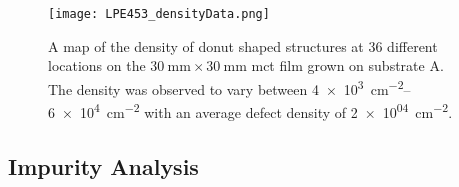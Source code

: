 \begin{figure}[htbp]
    \centering
    \texttt{[image: LPE453\_densityData.png]}
    \caption[Map of the density of donut shaped structures on the \ac{mct} film grown on substrate A.]{A map of the density of donut shaped structures at 36 different locations on the $\SI{30}{\milli\metre}\times\SI{30}{\milli\metre}$ \ac{mct} film grown on substrate A. The density was observed to vary between \SIrange{4e+3}{6e+4}{\centi\metre^{-2}} with an average defect density of \SI{2e+04}{\centi\metre^{-2}}.}
    \label{fig:LPE453_densityData}
\end{figure}


\subsection{Impurity Analysis}

